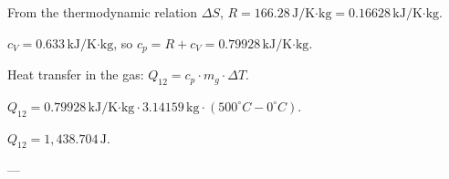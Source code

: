 From the thermodynamic relation \( \Delta S \), \( R = 166.28 \, \text{J/K·kg} = 0.16628 \, \text{kJ/K·kg} \).  

\( c_V = 0.633 \, \text{kJ/K·kg} \), so \( c_p = R + c_V = 0.79928 \, \text{kJ/K·kg} \).  

Heat transfer in the gas:  
\( Q_{12} = c_p \cdot m_g \cdot \Delta T \).  

\( Q_{12} = 0.79928 \, \text{kJ/K·kg} \cdot 3.14159 \, \text{kg} \cdot (500^\circ C - 0^\circ C) \).  

\( Q_{12} = 1,438.704 \, \text{J} \).  

---